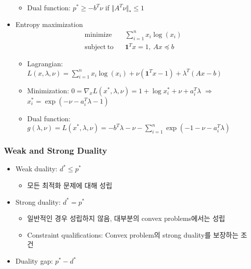 \begin{itemize}
\begin{itemize}
        \item Dual function: $p^\ast\geq-b^T\nu$ if $\Vert A^T\nu\Vert_\ast\leq 1$
    \end{itemize}
    \item Entropy maximization
        $$ \begin{aligned}
            \mathrm{minimize}~~&~~\sum_{i=1}^n x_i\log(x_i) \\
            \mathrm{subject~to}~~&~~\mathbf{1}^Tx = 1,~Ax\preceq b
        \end{aligned} $$
    \begin{itemize}
        \item Lagrangian: $L(x,\lambda,\nu)=\sum_{i=1}^nx_i\log(x_i)+\nu(\mathbf{1}^Tx-1)+\lambda^T(Ax-b)$
        \item Minimization: $0 = \nabla_x L(x^\ast,\lambda,\nu)=1+\log x_i^\ast+\nu+a_i^T\lambda$ $\Rightarrow$ $x_i^\ast=\exp(-\nu-a_i^T\lambda - 1)$
        \item Dual function: $g(\lambda,\nu)=L(x^\ast,\lambda,\nu)=-b^T\lambda-\nu-\sum_{i=1}^n\exp(-1-\nu-a_i^T\lambda)$
    \end{itemize}
\end{itemize}
\newpage

\subsubsection*{Weak and Strong Duality}
\begin{itemize}
    \item Weak duality: $d^\ast\leq p^\ast$
    \begin{itemize}
        \item 모든 최적화 문제에 대해 성립
    \end{itemize}
    \item Strong duality: $d^\ast = p^\ast$
    \begin{itemize}
        \item 일반적인 경우 성립하지 않음, 대부분의 convex problems에서는 성립
        \item Constraint qualifications: Convex problem의 strong duality를 보장하는 조건
    \end{itemize}
    \item Duality gap: $p^\ast - d^\ast$
\end{itemize}

